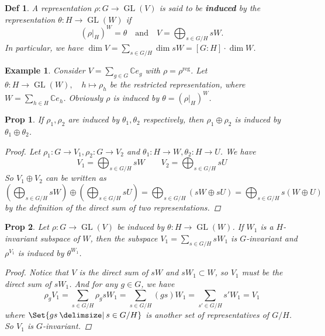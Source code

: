 \documentclass[a4paper]{article}
\newcommand*{\Cb}{\mathbb{C}}
\newcommand*\GL[1]{\operatorname{GL}\mathopen{}\left({#1}\right)\mathclose{}}
\providecommand\given{}
\newcommand*\SetSymbol[1][]{%
  \nonscript\:#1\vert
  \allowbreak
  \nonscript\:
\mathopen{}}
\renewcommand\given{\SetSymbol[\delimsize]}
\renewcommand\given{\SetSymbol[\delimsize]}
\theoremstyle{mystyle}
\newtheorem{definition}{Def}
\newtheorem{example}{Example}
\newtheorem{prop}{Prop}
\begin{document}
\begin{definition}
  A representation $\rho: G\to \GL{V}$ is said to be {\bf induced} by
  the representation $\theta: H\to \GL{W}$ if
  \[
    (\rho|_H)^W = \theta \quad \text{and} \quad V = \bigoplus_{s\in G/H} sW.
  \]
  In particular, we have
  $\displaystyle \dim V = \sum_{s\in G/H} \dim sW = [G:H] \cdot \dim W$.
\end{definition}

\begin{example}
  Consider $\displaystyle V = \sum_{g\in G} \Cb e_g$ with
  $\rho = \rho^\text{reg}$. Let $\theta: H\to \GL{W}, \quad h \mapsto \rho_h$
  be the restricted representation, where
  $\displaystyle W = \sum_{h\in H} \Cb e_h$. Obviously $\rho$ is
  induced by $\theta = (\rho|_H)^W$.
\end{example}

\begin{prop}
  If $\rho_1, \rho_2$ are induced by $\theta_1, \theta_2$ respectively, then
  $\rho_1 \oplus \rho_2$ is induced by $\theta_1 \oplus \theta_2$.

  \begin{proof}
    Let $\rho_1: G\to V_1, \rho_2: G\to V_2$ and
    $\theta_1: H\to W, \theta_2: H\to U$. We have
    \[
      V_1 = \bigoplus_{s\in G/H} sW \qquad V_2 = \bigoplus_{s\in G/H} sU
    \]
    So $V_1 \oplus V_2$ can be written as
    \[
      \left(\bigoplus_{s\in G/H} sW\right) \oplus
      \left(\bigoplus_{s\in G/H} sU\right)
      = \bigoplus_{s\in G/H} (sW \oplus sU)
      = \bigoplus_{s\in G/H} s(W \oplus U)
    \]
    by the definition of the direct sum of two representations.
  \end{proof}
\end{prop}

\begin{prop}
  Let $\rho: G\to \GL{V}$ be induced by $\theta: H\to \GL{W}$. If $W_1$ is
  a $H$-invariant subspace of $W$, then the subspace
  $\displaystyle V_1 = \sum_{s \in G/H} sW_1$ is $G$-invariant and
  $\rho^{V_1}$ is induced by $\theta^{W_1}$.
  \begin{proof}
    Notice that $V$ is the direct sum of $sW$ and $sW_1 \subset W$, so
    $V_1$ must be the direct sum of $sW_1$. And for any $g\in G$, we have
    \[
      \rho_g V_1 = \sum_{s\in G/H} \rho_g sW_1
      = \sum_{s\in G/H} (gs)W_1
      = \sum_{s'\in G/H} s'W_1 = V_1
    \]
    where $\Set{ gs \given s\in G/H }$ is another set of representatives of
    $G/H$. So $V_1$ is $G$-invariant.
  \end{proof}
\end{prop}
\end{document}

